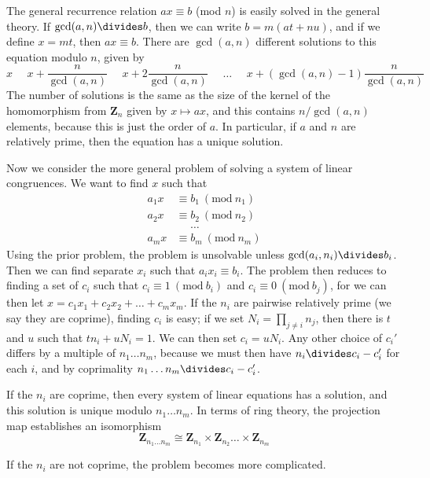 The general recurrence relation $ax \equiv b$ (mod $n$) is easily solved in the general theory. If $\gcd(a,n) \divides b$, then we can write $b = m(at + nu)$, and if we define $x = mt$, then $ax \equiv b$. There are $\gcd(a,n)$ different solutions to this equation modulo $n$, given by
%
\[ x\ \ \ \ \ \ x + \frac{n}{\gcd(a,n)}\ \ \ \ \ \ x + 2 \frac{n}{\gcd(a,n)}\ \ \ \ \ \ \dots\ \ \ \ \ \ x + (\gcd(a,n) - 1) \frac{n}{\gcd(a,n)} \]
%
The number of solutions is the same as the size of the kernel of the homomorphism from $\mathbf{Z}_n$ given by $x \mapsto ax$, and this contains $n/\gcd(a,n)$ elements, because this is just the order of $a$. In particular, if $a$ and $n$ are relatively prime, then the equation has a unique solution.

Now we consider the more general problem of solving a system of linear congruences. We want to find $x$ such that
%
\begin{align*}
    a_1x &\equiv b_1\ (\text{mod}\ n_1)\\
    a_2x &\equiv b_2\ (\text{mod}\ n_2)\\
    &\ \ \ \ \ \ \dots\\
    a_mx &\equiv b_m\ (\text{mod}\ n_m)
\end{align*}
%
Using the prior problem, the problem is unsolvable unless $\gcd(a_i, n_i) \divides b_i$. Then we can find separate $x_i$ such that $a_ix_i \equiv b_i$. The problem then reduces to finding a set of $c_i$ such that $c_i \equiv 1\ (\text{mod}\ b_i)$ and $c_i \equiv 0\ (\text{mod}\ b_j)$, for we can then let $x = c_1 x_1 + c_2 x_2 + \dots + c_m x_m$. If the $n_i$ are pairwise relatively prime (we say they are coprime), finding $c_i$ is easy; if we set $N_i = \prod_{j \neq i} n_j$, then there is $t$ and $u$ such that $tn_i + uN_i = 1$. We can then set $c_i = uN_i$. Any other choice of $c_i'$ differs by a multiple of $n_1 \dots n_m$, because we must then have $n_i \divides c_i - c_i'$ for each $i$, and by coprimality $n_1 \dots n_m \divides c_i - c_i'$.

\begin{theorem}
    If the $n_i$ are coprime, then every system of linear equations has a solution, and this solution is unique modulo $n_1 \dots n_m$. In terms of ring theory, the projection map establishes an isomorphism
    \[ \mathbf{Z}_{n_1 \dots n_m} \cong \mathbf{Z}_{n_1} \times \mathbf{Z}_{n_2} \dots \times \mathbf{Z}_{n_m} \]
\end{theorem}

If the $n_i$ are not coprime, the problem becomes more complicated.

